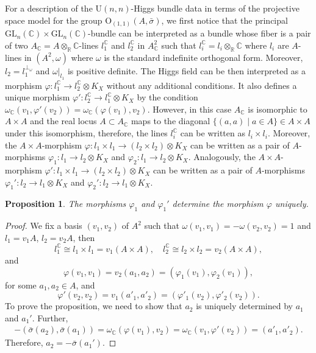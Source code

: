 \documentclass[oneside,11pt]{amsart}
\newtheorem{prop}[thm]{Proposition}
\theoremstyle{definition}
\theoremstyle{remark}
\numberwithin{thm}{section}
\numberwithin{equation}{section}
\begin{document}
For a description of the $\mathrm{U}(n,n)$-Higgs bundle data in terms of the projective space model for the group $\mathrm{O}_{(1,1)}(A,\bar\sigma)$, we first notice that the principal $\mathrm{GL}_n(\mathbb C)\times\mathrm{GL}_n(\mathbb C)$-bundle can be interpreted as a bundle whose fiber is a pair of two $A_\mathbb{C}=A\otimes_\mathbb R\mathbb C$-lines $l_1^\mathbb C$ and $l_2^\mathbb C$ in $A_\mathbb{C}^2$ such that $l_i^\mathbb C=l_i\otimes_\mathbb R\mathbb C$ where $l_i$ are $A$-lines in $(A^2,\omega)$ where $\omega$ is the standard indefinite orthogonal form. Moreover, $l_2=l_1^{\perp_{\omega}}$ and $\omega|_{l_1}$ is positive definite. The Higgs field can be then interpreted as a morphism $\varphi\colon l_1^\mathbb C\to l_2^\mathbb C\otimes K_X$ without any additional conditions. It also defines a unique morphism $\varphi'\colon l_2^\mathbb C\to l_1^\mathbb C\otimes K_X$ by the condition $\omega_\mathbb C(v_1,\varphi'(v_2))=\omega_\mathbb C(\varphi(v_1),v_2)$. However, in this case $A_\mathbb C$ is isomorphic to $A\times A$ and the real locus $A\subset A_\mathbb C$ maps to the diagonal $\{(a,a)\mid a\in A\}\in A\times A$ under this isomorphism, therefore, the lines $l_i^\mathbb C$ can be written as $l_i\times l_i$. Moreover, the $A\times A$-morphism $\varphi\colon l_1\times l_1\to (l_2\times l_2)\otimes K_X$ can be written as a pair of $A$-morphisms $\varphi_1\colon l_1\to l_2\otimes K_X$ and $\varphi_2\colon l_1\to l_2\otimes K_X$. Analogously, the $A\times A$-morphism $\varphi'\colon l_1\times l_1\to (l_2\times l_2)\otimes K_X$ can be written as a pair of $A$-morphisms $\varphi_1'\colon l_2\to l_1\otimes K_X$ and $\varphi_2'\colon l_2\to l_1\otimes K_X$.

\begin{prop}
    The morphisms $\varphi_1$ and $\varphi_1'$ determine the morphism $\varphi$ uniquely.
\end{prop}

\begin{proof}
    We fix a basis $(v_1,v_2)$ of $A^2$ such that $\omega(v_1,v_1)=-\omega(v_2,v_2)=1$ and $l_1=v_1A$, $l_2=v_2A$, then \[l_1^\mathbb C\cong l_1\times l_1=v_1(A\times A), \quad l_2^\mathbb C\cong l_2\times l_2=v_2(A\times A),\] and 
    \[\varphi(v_1,v_1)=v_2(a_1,a_2)=(\varphi_1(v_1),\varphi_2(v_1)),\] for some $a_1,a_2\in A$, and 
    $$\varphi'(v_2,v_2)=v_1(a'_1,a'_2)=(\varphi'_1(v_2),\varphi'_2(v_2)).$$ 
    To prove the proposition, we need to show that $a_2$ is uniquely determined by $a_1$ and $a_1'$. Further,
    \begin{align*}
    -(\bar\sigma(a_2),\bar\sigma(a_1))=\omega_\mathbb C(\varphi(v_1),v_2)=\omega_\mathbb C(v_1,\varphi'(v_2))=(a'_1,a'_2).
    \end{align*}
    Therefore, $a_2=-\bar\sigma(a_1')$.
\end{proof}
\end{document}
